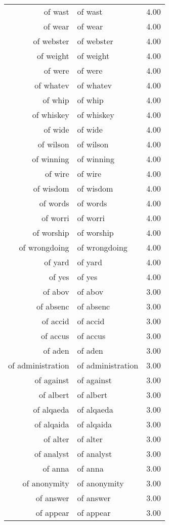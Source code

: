 \begin{table}[ht]
\begin{tabular}{rlr}
  of wast & of wast & 4.00 \\ 
  of wear & of wear & 4.00 \\ 
  of webster & of webster & 4.00 \\ 
  of weight & of weight & 4.00 \\ 
  of were & of were & 4.00 \\ 
  of whatev & of whatev & 4.00 \\ 
  of whip & of whip & 4.00 \\ 
  of whiskey & of whiskey & 4.00 \\ 
  of wide & of wide & 4.00 \\ 
  of wilson & of wilson & 4.00 \\ 
  of winning & of winning & 4.00 \\ 
  of wire & of wire & 4.00 \\ 
  of wisdom & of wisdom & 4.00 \\ 
  of words & of words & 4.00 \\ 
  of worri & of worri & 4.00 \\ 
  of worship & of worship & 4.00 \\ 
  of wrongdoing & of wrongdoing & 4.00 \\ 
  of yard & of yard & 4.00 \\ 
  of yes & of yes & 4.00 \\ 
  of abov & of abov & 3.00 \\ 
  of absenc & of absenc & 3.00 \\ 
  of accid & of accid & 3.00 \\ 
  of accus & of accus & 3.00 \\ 
  of aden & of aden & 3.00 \\ 
  of administration & of administration & 3.00 \\ 
  of against & of against & 3.00 \\ 
  of albert & of albert & 3.00 \\ 
  of alqaeda & of alqaeda & 3.00 \\ 
  of alqaida & of alqaida & 3.00 \\ 
  of alter & of alter & 3.00 \\ 
  of analyst & of analyst & 3.00 \\ 
  of anna & of anna & 3.00 \\ 
  of anonymity & of anonymity & 3.00 \\ 
  of answer & of answer & 3.00 \\ 
  of appear & of appear & 3.00 \\ 

\end{tabular}
\end{table}
